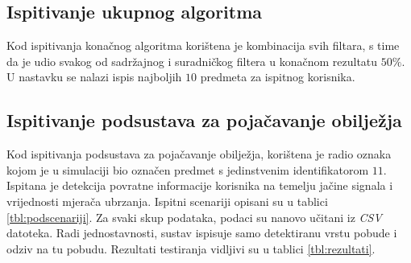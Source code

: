 \documentclass[times, utf8, diplomski, numeric]{fer}
\begin{document}


\subsection{Ispitivanje ukupnog algoritma}
Kod ispitivanja konačnog algoritma korištena je kombinacija svih filtara, s time
da je udio svakog od sadržajnog i suradničkog filtera u konačnom rezultatu
$50\%$. U nastavku se nalazi ispis najboljih $10$ predmeta za ispitnog
korisnika.

 
	
\subsection{Ispitivanje podsustava za pojačavanje obilježja}
Kod ispitivanja podsustava za pojačavanje obilježja, korištena je radio oznaka
kojom je u simulaciji bio označen predmet s jedinstvenim identifikatorom $11$.
Ispitana je detekcija povratne informacije korisnika na temelju jačine signala i
vrijednosti mjerača ubrzanja. Ispitni scenariji opisani su u tablici
\ref{tbl:podscenariji}. Za svaki skup podataka, podaci su nanovo učitani iz
\emph{CSV} datoteka. Radi jednostavnosti, sustav ispisuje samo detektiranu vrstu
pobude i odziv na tu pobudu. Rezultati testiranja vidljivi su u tablici
\ref{tbl:rezultati}.
\end{document}
